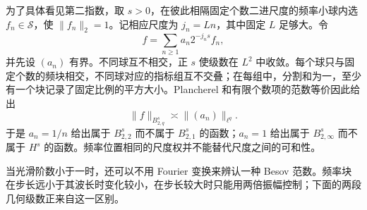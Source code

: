 \ProseParagraphBreak

为了具体看见第二指数，取 \(s>0\)，在彼此相隔固定个数二进尺度的频率小球内选 \(f_n\in\mathcal S\)，使 \(\|f_n\|_2=1\)。记相应尺度为 \(j_n=Ln\)，其中固定 \(L\) 足够大。令
\[
 f=\sum_{n\geq1}a_n2^{-j_ns}f_n,
\]
并先设 \((a_n)\) 有界。不同球互不相交，正 \(s\) 使级数在 \(L^2\) 中收敛。每个球只与固定个数的频块相交，不同球对应的指标组互不交叠；在每组中，分割和为一，至少有一个块记录了固定比例的平方大小。Plancherel 和有限个数项的范数等价因此给出
\[
 \|f\|_{B^s_{2,q}}\asymp\|(a_n)\|_{\ell^q}.
\]
于是 \(a_n=1/n\) 给出属于 \(B^s_{2,2}\) 而不属于 \(B^s_{2,1}\) 的函数；\(a_n=1\) 给出属于 \(B^s_{2,\infty}\) 而不属于 \(H^s\) 的函数。频率位置相同的尺度权并不能替代尺度之间的可和性。

\ProseParagraphBreak

当光滑阶数小于一时，还可以不用 Fourier 变换来辨认一种 Besov 范数。频率块在步长远小于其波长时变化较小，在步长较大时只能用两倍振幅控制；下面的两段几何级数正来自这一区别。

